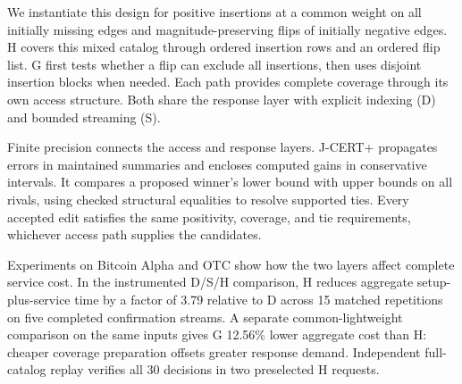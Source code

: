 We instantiate this design for positive insertions at a common weight on all initially missing edges and magnitude-preserving flips of initially negative edges. H covers this mixed catalog through ordered insertion rows and an ordered flip list. G first tests whether a flip can exclude all insertions, then uses disjoint insertion blocks when needed. Each path provides complete coverage through its own access structure. Both share the response layer with explicit indexing (D) and bounded streaming (S).

Finite precision connects the access and response layers. J-CERT+ propagates errors in maintained summaries and encloses computed gains in conservative intervals. It compares a proposed winner's lower bound with upper bounds on all rivals, using checked structural equalities to resolve supported ties. Every accepted edit satisfies the same positivity, coverage, and tie requirements, whichever access path supplies the candidates.

Experiments on Bitcoin Alpha and OTC show how the two layers affect complete service cost. In the instrumented D/S/H comparison, H reduces aggregate setup-plus-service time by a factor of 3.79 relative to D across 15 matched repetitions on five completed confirmation streams. A separate common-lightweight comparison on the same inputs gives G 12.56\% lower aggregate cost than H: cheaper coverage preparation offsets greater response demand. Independent full-catalog replay verifies all 30 decisions in two preselected H requests.


